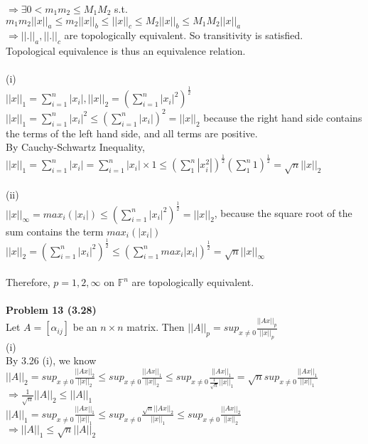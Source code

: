 \documentclass[letterpaper,12pt]{article}
\theoremstyle{definition}
\begin{document}
$\Rightarrow \exists 0<m_1m_2\leq M_1M_2$ s.t. $m_1m_2||x||_a\leq m_2||x||_b\leq ||x||_c\leq M_2||x||_b\leq M_1M_2||x||_a$\\
$\Rightarrow ||.||_a, ||.||_c$ are topologically equivalent. So transitivity is satisfied.\\ 
Topological equivalence is thus an equivalence relation.\\
\\
(i)\\
$||x||_1 = \sum_{i=1}^n|x_i|, ||x||_2=(\sum_{i=1}^n |x_i|^2)^{\frac{1}{2}}$\\
$||x||_1 = \sum_{i=1}^n |x_i|^2\leq (\sum_{i=1}^n|x_i|)^2 = ||x||_2$ because the right hand side contains the terms of the left hand side, and all terms are positive. \\
By Cauchy-Schwartz Inequality, \\
$||x||_1 = \sum_{i=1}^n|x_i|=\sum_{i=1}^n|x_i| \times 1 \leq (\sum_1^n |x_i^2|)^{\frac{1}{2}}(\sum_1^n 1)^{\frac{1}{2}} = \sqrt{n}||x||_2$\\
\\
(ii)\\
$||x||_{\infty} = max_i(|x_i|)\leq (\sum_{i=1}^n |x_i|^2)^{\frac{1}{2}} =||x||_2$, because the square root of the sum contains the term $max_i(|x_i|)$\\
$||x||_2 =  (\sum_{i=1}^n |x_i|^2)^{\frac{1}{2}} \leq (\sum_{i=1}^n max_i|x_i|)^{\frac{1}{2}} = \sqrt{n}||x||_{\infty}$\\
\\
Therefore, $p=1,2,\infty$ on $\mathbb{F}^n$ are topologically equivalent.\\
\\
\noindent\textbf{Problem 13 (3.28)}\\
Let $A=[\alpha_{ij}]$ be an $n\times n$ matrix. Then $||A||_p = sup_{x\neq 0}\frac{||Ax||_p}{||x||_p}$\\
(i)\\
By 3.26 (i), we know\\
$||A||_2 = sup_{x\neq 0}\frac{||Ax||_2}{||x||_2} \leq sup_{x\neq 0}
\frac{||Ax||_1}{||x||_2}\leq  sup_{x\neq 0}
\frac{||Ax||_1}{\frac{1}{\sqrt{n}}||x||_1}=\sqrt{n}sup_{x\neq 0}\frac{||Ax||_1}{||x||_1}$\\
$\Rightarrow \frac{1}{\sqrt{n}}||A||_2 \leq ||A||_1$\\
$||A||_1 = sup_{x\neq 0}\frac{||Ax||_1}{||x||_1} \leq sup_{x\neq 0}\frac{\sqrt{n}||Ax||_2}{||x||_1} \leq sup_{x\neq 0}\frac{||Ax||_2}{||x||_2}$\\
$\Rightarrow ||A||_1\leq \sqrt{n}||A||_2$\\
\end{document}

